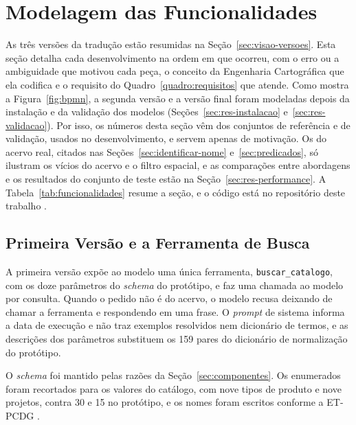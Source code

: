 \section{Modelagem das Funcionalidades}
\label{sec:res-modelagem}

As três versões da tradução estão resumidas na Seção~\ref{sec:visao-versoes}. Esta seção detalha cada desenvolvimento na ordem em que ocorreu, com o erro ou a ambiguidade que motivou cada peça, o conceito da Engenharia Cartográfica que ela codifica e o requisito do Quadro~\ref{quadro:requisitos} que atende. Como mostra a Figura~\ref{fig:bpmn}, a segunda versão e a versão final foram modeladas depois da instalação e da validação dos modelos (Seções~\ref{sec:res-instalacao} e~\ref{sec:res-validacao}). Por isso, os números desta seção vêm dos conjuntos de referência e de validação, usados no desenvolvimento, e servem apenas de motivação. Os do acervo real, citados nas Seções~\ref{sec:identificar-nome} e~\ref{sec:predicados}, só ilustram os vícios do acervo e o filtro espacial, e as comparações entre abordagens e os resultados do conjunto de teste estão na Seção~\ref{sec:res-performance}. A Tabela~\ref{tab:funcionalidades} resume a seção, e o código está no repositório deste trabalho \cite{correa2026pfcbusca}.

\subsection{Primeira Versão e a Ferramenta de Busca}
\label{sec:primeira-versao}

A primeira versão expõe ao modelo uma única ferramenta, \texttt{buscar\_catalogo}, com os doze parâmetros do \textit{schema} do protótipo, e faz uma chamada ao modelo por consulta. Quando o pedido não é do acervo, o modelo recusa deixando de chamar a ferramenta e respondendo em uma frase. O \textit{prompt} de sistema informa a data de execução e não traz exemplos resolvidos nem dicionário de termos, e as descrições dos parâmetros substituem os 159 pares do dicionário de normalização do protótipo.

O \textit{schema} foi mantido pelas razões da Seção~\ref{sec:componentes}. Os enumerados foram recortados para os valores do catálogo, com nove tipos de produto e nove projetos, contra 30 e 15 no protótipo, e os nomes foram escritos conforme a ET-PCDG \cite{etpcdg2016}.

